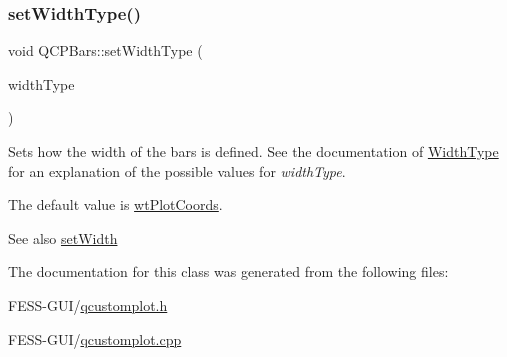 \subsubsection{\texorpdfstring{set\+Width\+Type()}{setWidthType()}}
{\footnotesize\ttfamily void Q\+C\+P\+Bars\+::set\+Width\+Type (\begin{DoxyParamCaption}\item[{\hyperlink{class_q_c_p_bars_a65dbbf1ab41cbe993d71521096ed4649}{Q\+C\+P\+Bars\+::\+Width\+Type}}]{width\+Type }\end{DoxyParamCaption})}

Sets how the width of the bars is defined. See the documentation of \hyperlink{class_q_c_p_bars_a65dbbf1ab41cbe993d71521096ed4649}{Width\+Type} for an explanation of the possible values for {\itshape width\+Type}.

The default value is \hyperlink{class_q_c_p_bars_a65dbbf1ab41cbe993d71521096ed4649aad3cc60ae1bfb1160a30237bee9eaf10}{wt\+Plot\+Coords}.

\begin{DoxySeeAlso}{See also}
\hyperlink{class_q_c_p_bars_afec6116579d44d5b706e0fa5e5332507}{set\+Width} 
\end{DoxySeeAlso}


The documentation for this class was generated from the following files\+:\begin{DoxyCompactItemize}
\item 
F\+E\+S\+S-\/\+G\+U\+I/\hyperlink{qcustomplot_8h}{qcustomplot.\+h}\item 
F\+E\+S\+S-\/\+G\+U\+I/\hyperlink{qcustomplot_8cpp}{qcustomplot.\+cpp}\end{DoxyCompactItemize}
